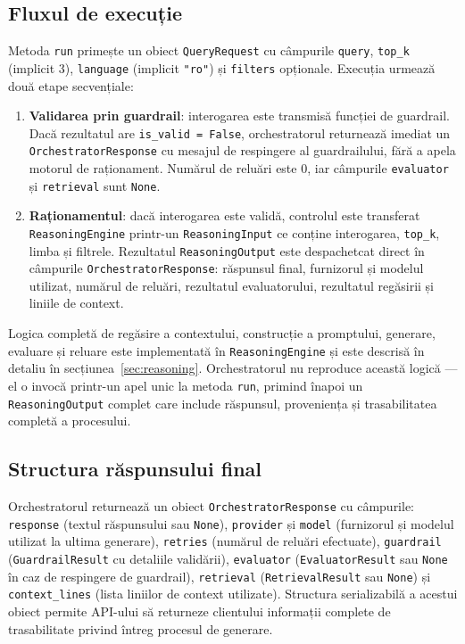 \documentclass[12pt, a4paper, oneside, romanian]{teza-upb}
\begin{document}
\subsection{Fluxul de execuție}

Metoda \texttt{run} primește un obiect \texttt{QueryRequest} cu câmpurile \texttt{query}, \texttt{top\_k} (implicit 3), \texttt{language} (implicit \texttt{"ro"}) și \texttt{filters} opționale. Execuția urmează două etape secvențiale:

\begin{enumerate}
    \item \textbf{Validarea prin guardrail}: interogarea este transmisă funcției de guardrail. Dacă rezultatul are \texttt{is\_valid = False}, orchestratorul returnează imediat un \texttt{OrchestratorResponse} cu mesajul de respingere al guardrailului, fără a apela motorul de raționament. Numărul de reluări este 0, iar câmpurile \texttt{evaluator} și \texttt{retrieval} sunt \texttt{None}.
    \item \textbf{Raționamentul}: dacă interogarea este validă, controlul este transferat \texttt{ReasoningEngine} printr-un \texttt{ReasoningInput} ce conține interogarea, \texttt{top\_k}, limba și filtrele. Rezultatul \texttt{ReasoningOutput} este despachetcat direct în câmpurile \texttt{OrchestratorResponse}: răspunsul final, furnizorul și modelul utilizat, numărul de reluări, rezultatul evaluatorului, rezultatul regăsirii și liniile de context.
\end{enumerate}

Logica completă de regăsire a contextului, construcție a promptului, generare, evaluare și reluare este implementată în \texttt{ReasoningEngine} și este descrisă în detaliu în secțiunea~\ref{sec:reasoning}. Orchestratorul nu reproduce această logică — el o invocă printr-un apel unic la metoda \texttt{run}, primind înapoi un \texttt{ReasoningOutput} complet care include răspunsul, proveniența și trasabilitatea completă a procesului.

\subsection{Structura răspunsului final}

Orchestratorul returnează un obiect \texttt{OrchestratorResponse} cu câmpurile: \texttt{response} (textul răspunsului sau \texttt{None}), \texttt{provider} și \texttt{model} (furnizorul și modelul utilizat la ultima generare), \texttt{retries} (numărul de reluări efectuate), \texttt{guardrail} (\texttt{GuardrailResult} cu detaliile validării), \texttt{evaluator} (\texttt{EvaluatorResult} sau \texttt{None} în caz de respingere de guardrail), \texttt{retrieval} (\texttt{RetrievalResult} sau \texttt{None}) și \texttt{context\_lines} (lista liniilor de context utilizate). Structura serializabilă a acestui obiect permite API-ului să returneze clientului informații complete de trasabilitate privind întreg procesul de generare.
\end{document}
